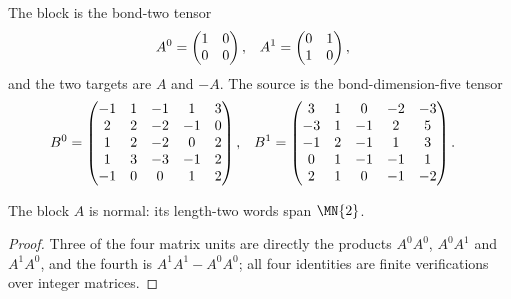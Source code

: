 \begin{definition}
    \label{def:asymex_parity}
    \leanok
    The block is the bond-two tensor
    \begin{align}
        A^0 & =\begin{pmatrix}1&0\\0&0\end{pmatrix},
            &
        A^1 & =\begin{pmatrix}0&1\\1&0\end{pmatrix},
        \notag
    \end{align}
    and the two targets are $A$ and $-A$. The source is the
    bond-dimension-five tensor
    \begin{align}
        B^0
         & =\begin{pmatrix}
                -1 & 1 & -1 & 1  & 3 \\
                2  & 2 & -2 & -1 & 0 \\
                1  & 2 & -2 & 0  & 2 \\
                1  & 3 & -3 & -1 & 2 \\
                -1 & 0 & 0  & 1  & 2
            \end{pmatrix},
         &
        B^1
         & =\begin{pmatrix}
                3  & 1 & 0  & -2 & -3 \\
                -3 & 1 & -1 & 2  & 5  \\
                -1 & 2 & -1 & 1  & 3  \\
                0  & 1 & -1 & -1 & 1  \\
                2  & 1 & 0  & -1 & -2
            \end{pmatrix}.
        \notag
    \end{align}
\end{definition}

\begin{theorem}
    \label{thm:asymex_parity_normal}
    \leanok
    The block $A$ is normal: its length-two words span $\MN{2}$.
\end{theorem}

\begin{proof}
    \leanok
    Three of the four matrix units are directly the products $A^0A^0$,
    $A^0A^1$ and $A^1A^0$, and the fourth is $A^1A^1-A^0A^0$; all four
    identities are finite verifications over integer matrices.
\end{proof}


